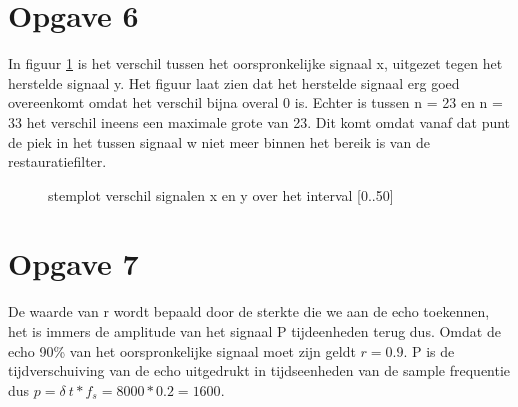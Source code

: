 \documentclass{article}
\begin{document}
\section{Opgave 6}
In figuur \ref{opgave6} is het verschil tussen het oorspronkelijke signaal x, uitgezet tegen het herstelde signaal y. Het figuur laat zien dat het herstelde signaal erg goed overeenkomt omdat het verschil bijna overal 0 is. Echter is tussen n = 23 en n = 33 het verschil ineens een maximale grote van 23. Dit komt omdat vanaf dat punt de piek in het tussen signaal w niet meer binnen het bereik is van de restauratiefilter.

\begin{figure}[h]
  \centering
  \caption{stemplot verschil signalen x en y over het interval [0..50]}
  \label{opgave6}
\end{figure}

\section{Opgave 7}
De waarde van r wordt bepaald door de sterkte die we aan de echo toekennen, het is immers de amplitude van het signaal P tijdeenheden terug dus. Omdat de echo 90\% van het oorspronkelijke signaal moet zijn geldt $r = 0.9$. P is de tijdverschuiving van de echo uitgedrukt in tijdseenheden van de sample frequentie dus $p = \delta~t*f_s = 8000 * 0.2 = 1600$.
\end{document}

